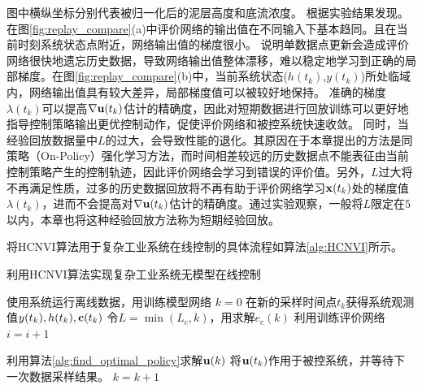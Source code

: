 图中横纵坐标分别代表被归一化后的泥层高度和底流浓度。
根据实验结果发现。在图\ref{fig:replay_compare}(a)中评价网络的输出值在不同输入下基本趋同。且在当前时刻系统状态点附近，网络输出值的梯度很小。
说明单数据点更新会造成评价网络很快地遗忘历史数据，导致网络输出值整体漂移，难以稳定地学习到正确的局部梯度。在图\ref{fig:replay_compare}(b)中，当前系统状态($h(t_k)$,$y(t_k)$)所处临域内，网络输出值具有较大差异，局部梯度值可以被较好地保持。
准确的梯度$\lambda(t_k)$可以提高$\nabla \mathbf
u(t_k)$估计的精确度，因此对短期数据进行回放训练可以更好地指导控制策略输出更优控制动作，促使评价网络和被控系统快速收敛。
同时，当经验回放数据量中$L$的过大，会导致性能的退化。其原因在于本章提出的方法是同策略（On-Policy）强化学习方法，而时间相差较远的历史数据点不能表征由当前控制策略产生的控制轨迹，因此评价网络会学习到错误的评价值。另外，$L$过大将不再满足性质，过多的历史数据回放将不再有助于评价网络学习$\mathbf
x(t_k)$处的梯度值$\lambda(t_k)$，进而不会提高对$\nabla \mathbf
u(t_k)$估计的精确度。通过实验观察，一般将$L$限定在$5$以内，本章也将这种经验回放方法称为短期经验回放。



将HCNVI算法用于复杂工业系统在线控制的具体流程如算法\ref{alg:HCNVI}所示。

\begin{algorithm}[htb]

\caption{利用HCNVI算法实现复杂工业系统无模型在线控制} %
\label{alg:HCNVI}

\begin{algorithmic}[1]


\State
使用系统运行离线数据，用训练模型网络
\State $k=0$ 
\State 在新的采样时间点$t_k$获得系统观测值$y(t_k), h(t_k),\mathbf c(t_k)$
\Do
    \State 令$L=\min(L_c, k)$，用求解$e_c(k)$
    \State 利用训练评价网络
    \State $i=i+1$

\State 利用算法\ref{alg:find_optimal_policy}求解${\mathbf u}(k)$ \State
将${\mathbf u}(t_k)$作用于被控系统，并等待下一次数据采样结果。 \State $k=k+1$

\EndWhile
\end{algorithmic}

\end{algorithm}

